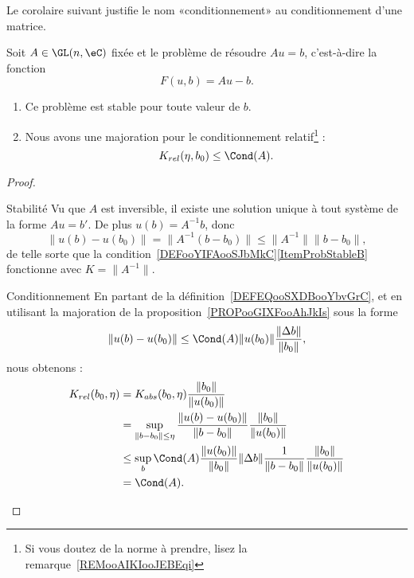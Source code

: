 Le corolaire suivant justifie le nom «conditionnement» au conditionnement d'une matrice.
\begin{corollary}       \label{CORooXKPWooJVHVvh}
	Soit \( A\in \GL(n,\eC)\) fixée et le problème de résoudre \( Au=b\), c'est-à-dire la fonction
	\begin{equation}
		F(u,b)=Au-b.
	\end{equation}
	\begin{enumerate}
		\item
		      Ce problème est stable pour toute valeur de \( b\).
		\item
		      Nous avons une majoration pour le conditionnement relatif\footnote{Si vous doutez de la norme à prendre, lisez la remarque~\ref{REMooAIKIooJEBEqi}} :
		      \begin{equation}        \label{EQooZHQJooTMKYfr}
			      K_{rel}(\eta,b_0)\leq \Cond(A).
		      \end{equation}
	\end{enumerate}
\end{corollary}

\begin{proof}
	\begin{subproof}
		\item[Stabilité]
		Vu que \( A\) est inversible, il existe une solution unique à tout système de la forme \( Au=b'\). De plus \( u(b)=A^{-1} b\), donc
		\begin{equation}
			\| u(b)-u(b_0) \|= \| A^{-1}(b-b_0) \|\leq \| A^{-1} \|\| b-b_0 \|,
		\end{equation}
		de telle sorte que la condition~\ref{DEFooYIFAooSJbMkC}\ref{ItemProbStableB} fonctionne avec \( K=\| A^{-1} \|\).
		\item[Conditionnement]
		En partant de la définition~\ref{DEFEQooSXDBooYbvGrC}, et en utilisant la majoration de la proposition~\ref{PROPooGIXFooAhJkIs} sous la forme
		\begin{equation}
			\| u(b)-u(b_0) \|\leq \Cond(A)\| u(b_0) \|\frac{ \| \Delta b \| }{ \| b_0 \| },
		\end{equation}
		nous obtenons :
		\begin{subequations}
			\begin{align}
				K_{rel}(b_0,\eta) & =K_{abs}(b_0,\eta)\frac{ \| b_0 \| }{ \| u(b_0) \| }                                                                         \\
				                  & =\sup_{\| b-b_0 \|\leq \eta}\frac{ \| u(b)-u(b_0) \| }{ \| b-b_0 \| }\frac{ \| b_0 \| }{ \| u(b_0) \| }                      \\
				                  & \leq \sup_b\Cond(A)\frac{ \| u(b_0) \| }{ \| b_0 \| }\| \Delta b \|\frac{1}{ \| b-b_0 \| }\frac{ \| b_0 \| }{ \| u(b_0) \| } \\
				                  & =\Cond(A).
			\end{align}
		\end{subequations}
	\end{subproof}
\end{proof}

